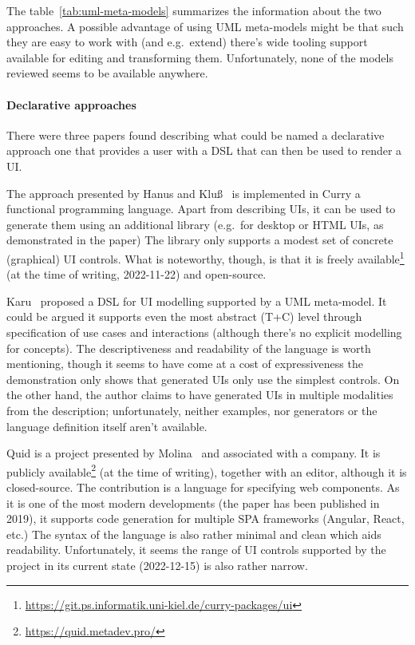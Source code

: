 The table~\ref{tab:uml-meta-models} summarizes the information about the two approaches.
A possible advantage of using UML meta-models might be that such they are easy to work with (and e.g.~extend)\,\textemdash\,there's wide tooling support available for editing and transforming them.
Unfortunately, none of the models reviewed seems to be available anywhere.

\paragraph{Declarative approaches}

There were three papers found describing what could be named a declarative approach\,\textemdash\,one that provides a user with a DSL that can then be used to render a UI\@.

The approach presented by Hanus and Kluß~\cite{Hanus2008-hm} is implemented in Curry\,\textemdash\,a functional programming language.
Apart from describing UIs, it can be used to generate them using an additional library (e.g.\ for desktop or HTML UIs, as demonstrated in the paper)
The library only supports a modest set of concrete (graphical) UI controls.
What is noteworthy, though, is that it is freely available\footnote{\url{https://git.ps.informatik.uni-kiel.de/curry-packages/ui}} (at the time of writing, 2022-11-22) and open-source.

Karu~\cite{Karu2013-po} proposed a DSL for UI modelling supported by a UML meta-model.
It could be argued it supports even the most abstract (T+C) level through specification of use cases and interactions (although there's no explicit modelling for concepts).
The descriptiveness and readability of the language is worth mentioning, though it seems to have come at a cost of expressiveness\,\textemdash\,the demonstration only shows that generated UIs only use the simplest controls.
On the other hand, the author claims to have generated UIs in multiple modalities from the description;
unfortunately, neither examples, nor generators or the language definition itself aren't available.

Quid is a project presented by Molina~\cite{molina2019quid} and associated with a company.
It is publicly available\footnote{\url{https://quid.metadev.pro/}} (at the time of writing), together with an editor, although it is closed-source.
The contribution is a language for specifying web components.
As it is one of the most modern developments (the paper has been published in 2019), it supports code generation for multiple SPA frameworks (Angular, React, etc.)
The syntax of the language is also rather minimal and clean which aids readability.
Unfortunately, it seems the range of UI controls supported by the project in its current state (2022-12-15) is also rather narrow.

